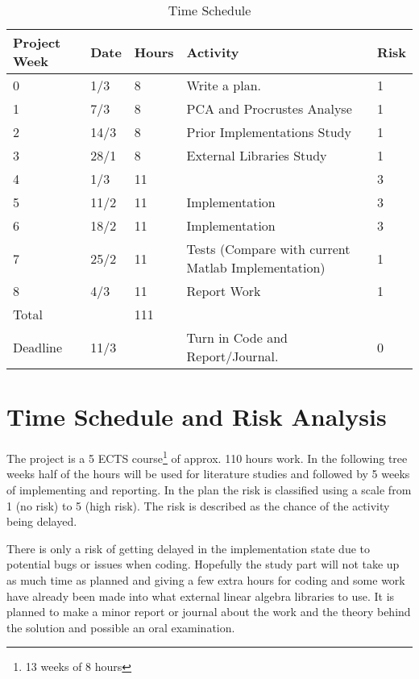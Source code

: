 \documentclass[10pt,journal,twocolumn]{IEEEtran}
\begin{document}
\begin{table*}[!b]
\normalsize
\centering
\renewcommand{\arraystretch}{1.3}
\caption{Time Schedule}
\begin{tabular}{lllll}
Project Week 	& Date 	& Hours & Activity 											& Risk	\\ \hline
0 				& 1/3	& 8		& Write a plan.										& 1		\\
1				& 7/3   & 8     & PCA and Procrustes Analyse						& 1 	\\
2				& 14/3  & 8	    & Prior Implementations Study 						& 1     \\
3				& 28/1  & 8     & External Libraries Study							& 1		\\
4				& 1/3 	& 11	& 													& 3		\\
5				& 11/2	& 11	& Implementation									& 3		\\
6				& 18/2	& 11	& Implementation									& 3		\\
7				& 25/2  & 11	& Tests (Compare with current Matlab Implementation)& 1		\\
8				& 4/3   & 11  	& Report Work										& 1		\\ \hline
\multicolumn{2}{l}{Total}& \multicolumn{3}{l}{111}\\ \hline
Deadline  		& 11/3  & 	& Turn in Code and Report/Journal.					& 0		\\
\end{tabular}

\label{tab:timeschedule}
\hrulefill
\vspace*{4pt}
\end{table*}

\section{Time Schedule and Risk Analysis}
The project is a 5 ECTS course\footnote{13 weeks of 8 hours} of approx. 110 hours work. In the following tree weeks half of the hours will be used for literature studies and followed by 5 weeks of implementing and reporting. In the plan the risk is classified using a scale from 1 (no risk) to 5 (high risk). The risk is described as the chance of the activity being delayed.

There is only a risk of getting delayed in the implementation state due to potential bugs or issues when coding. Hopefully the study part will not take up as much time as planned and giving a few extra hours for coding and some work have already been made into what external linear algebra libraries to use. It is planned to make a minor report or journal about the work and the theory behind the solution and possible an oral examination. 
\end{document}
